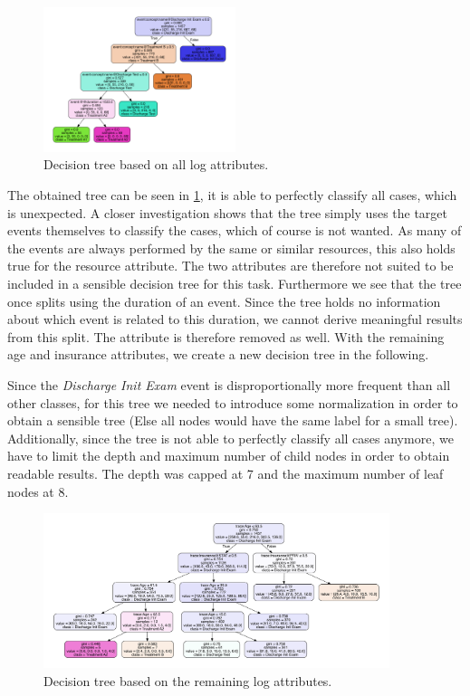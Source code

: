\documentclass[12pt]{report}
\begin{document}
\begin{figure}[h]
    \centering
    \includegraphics[width=0.5\textwidth]{figures/q4_tree_all.pdf}
    \caption{Decision tree based on all log attributes.}
    \label{fig:figures-q4-tree-all-png}
\end{figure}

The obtained tree can be seen in \ref{fig:figures-q4-tree-all-png}, it is able to perfectly classify all cases, which is unexpected. A closer investigation shows that the tree simply uses the target events themselves to classify the cases, which of course is not wanted. As many of the events are always performed by the same or similar resources, this also holds true for the resource attribute. The two attributes are therefore not suited to be included in a sensible decision tree for this task.
Furthermore we see that the tree once splits using the duration of an event. Since the tree holds no information about which event is related to this duration, we cannot derive meaningful results from this split. The attribute is therefore removed as well. With the remaining age and insurance attributes, we create a new decision tree in the following.

Since the \emph{Discharge Init Exam} event is disproportionally more frequent than all other classes, for this tree we needed to introduce some normalization in order to obtain a sensible tree (Else all nodes would have the same label for a small tree). Additionally, since the tree is not able to perfectly classify all cases anymore, we have to limit the depth and maximum number of child nodes in order to obtain readable results. The depth was capped at 7 and the maximum number of leaf nodes at 8.

\begin{figure}[h]
    \centering
    \includegraphics[width=0.9\textwidth]{figures/q4_tree_min.pdf}
    \caption{Decision tree based on the remaining log attributes.}
    \label{fig:figures-q4-tree-min-png}
\end{figure}
\end{document}
